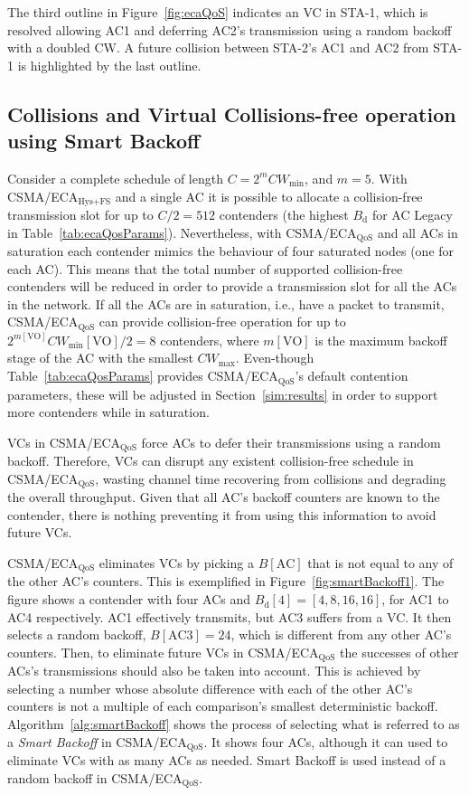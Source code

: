 The third outline in Figure~\ref{fig:ecaQoS} indicates an VC in STA-1, which is resolved allowing AC1 and deferring AC2's transmission using a random backoff with a doubled CW. A future collision between STA-2's AC1 and AC2 from STA-1 is highlighted by the last outline.

\subsection{Collisions and Virtual Collisions-free operation using Smart Backoff}\label{ECAqosCollisionFree}
Consider a complete schedule of length $C=2^{m}CW_{\min}$, and $m=5$. With CSMA/ECA$_{\text{Hys+FS}}$ and a single AC it is possible to allocate a collision-free transmission slot for up to $C/2=512$ contenders (the highest $B_{\text{d}}$ for AC Legacy in Table~\ref{tab:ecaQosParams}). Nevertheless, with CSMA/ECA$_{\text{QoS}}$ and all ACs in saturation each contender mimics the behaviour of four saturated nodes (one for each AC). This means that the total number of supported collision-free contenders will be reduced in order to provide a transmission slot for all the ACs in the network. If all the ACs are in saturation, i.e., have a packet to transmit, CSMA/ECA$_{\text{QoS}}$ can provide collision-free operation for up to $2^{m[\text{VO}]}CW_{\min}[\text{VO}]/2=8$ contenders, where $m[\text{VO}]$ is the maximum backoff stage of the AC with the smallest $CW_{\max}$. Even-though Table~\ref{tab:ecaQosParams} provides CSMA/ECA$_{\text{QoS}}$'s default contention parameters, these will be adjusted in Section~\ref{sim:results} in order to support more contenders while in saturation.

VCs in CSMA/ECA$_{\text{QoS}}$ force ACs to defer their transmissions using a random backoff. Therefore, VCs can disrupt any existent collision-free schedule in CSMA/ECA$_{\text{QoS}}$, wasting channel time recovering from collisions and degrading the overall throughput. Given that all AC's backoff counters are known to the contender, there is nothing preventing it from using this information to avoid future VCs.

CSMA/ECA$_{\text{QoS}}$ eliminates VCs by picking a $B[\text{AC}]$ that is not equal to any of the other AC's counters. This is exemplified in Figure~\ref{fig:smartBackoff1}. The figure shows a contender with four ACs and $B_{\text{d}}[4]=[4,8,16,16]$, for AC1 to AC4 respectively. AC1 effectively transmits, but AC3 suffers from a VC. It then selects a random backoff, $B[\text{AC3}]=24$, which is different from any other AC's counters. Then, to eliminate future VCs in CSMA/ECA$_{\text{QoS}}$ the successes of other ACs's transmissions should also be taken into account. This is achieved by selecting a number whose absolute difference with each of the other AC's counters is not a multiple of each comparison's smallest deterministic backoff. Algorithm~\ref{alg:smartBackoff} shows the process of selecting what is referred to as a \emph{Smart Backoff} in CSMA/ECA$_{\text{QoS}}$. It shows four ACs, although it can used to eliminate VCs with as many ACs as needed. Smart Backoff is used instead of a random backoff in CSMA/ECA$_{\text{QoS}}$.

